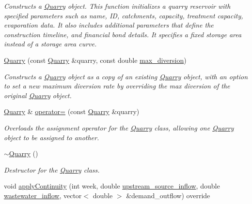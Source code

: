 \begin{DoxyCompactItemize}
\begin{DoxyCompactList}\small\item\em Constructs a \mbox{\hyperlink{classQuarry}{Quarry}} object. This function initializes a quarry reservoir with specified parameters such as name, ID, catchments, capacity, treatment capacity, evaporation data. It also includes additional parameters that define the construction timeline, and financial bond details. It specifies a fixed storage area instead of a storage area curve. \end{DoxyCompactList}\item 
\mbox{\hyperlink{classQuarry_a5a43f5a3f1cb837bc313046cf82b49e3}{Quarry}} (const \mbox{\hyperlink{classQuarry}{Quarry}} \&quarry, const double \mbox{\hyperlink{classQuarry_a5cb60f94475d5991a795cb9117e0b83f}{max\+\_\+diversion}})
\begin{DoxyCompactList}\small\item\em Constructs a \mbox{\hyperlink{classQuarry}{Quarry}} object as a copy of an existing \mbox{\hyperlink{classQuarry}{Quarry}} object, with an option to set a new maximum diversion rate by overriding the max diversion of the original \mbox{\hyperlink{classQuarry}{Quarry}} object. \end{DoxyCompactList}\item 
\mbox{\hyperlink{classQuarry}{Quarry}} \& \mbox{\hyperlink{classQuarry_adc3df376f620f8337b5dbf0868cf7fb6}{operator=}} (const \mbox{\hyperlink{classQuarry}{Quarry}} \&quarry)
\begin{DoxyCompactList}\small\item\em Overloads the assignment operator for the \mbox{\hyperlink{classQuarry}{Quarry}} class, allowing one \mbox{\hyperlink{classQuarry}{Quarry}} object to be assigned to another. \end{DoxyCompactList}\item 
\mbox{\hyperlink{classQuarry_a6c528c6222e8e5adc134db5cafbe62e3}{$\sim$\+Quarry}} ()
\begin{DoxyCompactList}\small\item\em Destructor for the \mbox{\hyperlink{classQuarry}{Quarry}} class. \end{DoxyCompactList}\item 
void \mbox{\hyperlink{classQuarry_a6999b854a740ce92baaa610cf5b08bd9}{apply\+Continuity}} (int week, double \mbox{\hyperlink{classWaterSource_a7a69b2e9b6030f1035e6cf44d2918ee5}{upstream\+\_\+source\+\_\+inflow}}, double \mbox{\hyperlink{classWaterSource_aeb5a2d2d83383a70ca20f3e94635a9c7}{wastewater\+\_\+inflow}}, vector$<$ double $>$ \&demand\+\_\+outflow) override

\end{DoxyCompactItemize}
